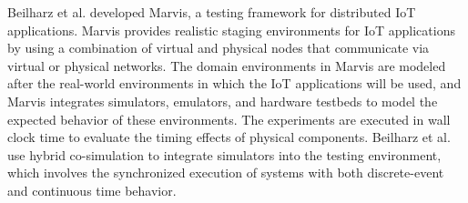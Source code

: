 Beilharz et al. \cite{beilharz2021} developed Marvis, a testing framework for
distributed IoT applications. Marvis provides realistic staging environments for
IoT applications by using a combination of virtual and physical nodes that
communicate via virtual or physical networks. The domain environments in Marvis
are modeled after the real-world environments in which the IoT applications will
be used, and Marvis integrates simulators, emulators, and hardware testbeds to
model the expected behavior of these environments. The experiments are executed
in wall clock time to evaluate the timing effects of physical components.
Beilharz et al. use hybrid co-simulation to integrate simulators into the
testing environment, which involves the synchronized execution of systems with
both discrete-event and continuous time behavior.
